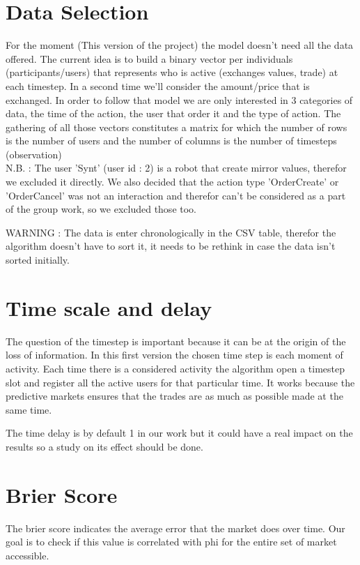 \documentclass{report}
\begin{document}
\section{Data Selection}

For the moment (This version of the project) the model doesn't need all the data offered. The current idea is to build a binary vector per individuals (participants/users) that represents who is active (exchanges values, trade) at each timestep. In a second time we'll consider the amount/price that is exchanged. In order to follow that model we are only interested in 3 categories of data, the time of the action, the user that order it and the type of action. The gathering of all those vectors constitutes a matrix for which the number of rows is the number of users and the number of columns is the number of timesteps (observation)\\

N.B. : The user 'Synt' (user id : 2) is a robot that create mirror values, therefor we excluded it directly. We also decided that the action type 'OrderCreate' or 'OrderCancel' was not an interaction and therefor can't be considered as a part of the group work, so we excluded those too.

WARNING : The data is enter chronologically in the CSV table, therefor the algorithm doesn't have to sort it, it needs to be rethink in case the data isn't sorted initially.

\section{Time scale and delay}

The question of the timestep is important because it can be at the origin of the loss of information. In this first version the chosen time step is each moment of activity. Each time there is a considered activity the algorithm open a timestep slot and register all the active users for that particular time. It works because the predictive markets ensures that the trades are as much as possible made at the same time.

The time delay is by default 1 in our work but it could have a real impact on the results so a study on its effect should be done. 

\section{Brier Score}

The brier score indicates the average error that the market does over time. Our goal is to check if this value is correlated with phi for the entire set of market accessible.
\end{document}
